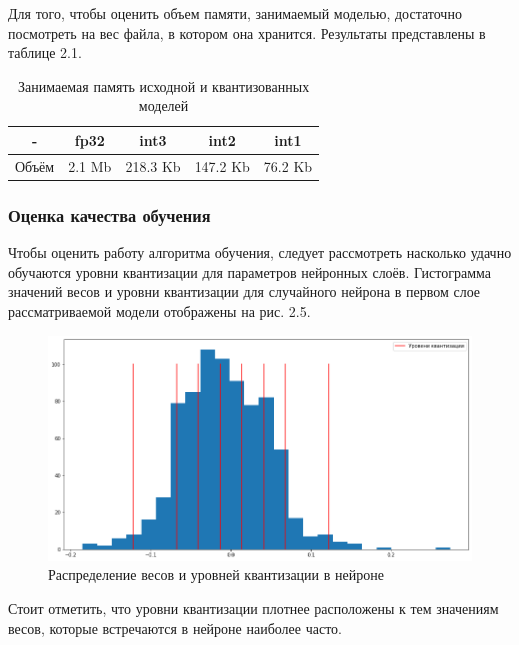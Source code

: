 Для того, чтобы оценить объем памяти, занимаемый моделью, достаточно посмотреть на вес файла, в котором она хранится. Результаты представлены в таблице 2.1.

\begin{table}[H]
\caption{Занимаемая память исходной и квантизованных моделей}
\begin{center}
\begin{tabular}{|c|c|c|c|c|}
\hline
 -  & fp32 & int3 & int2 & int1 \\
\hline
Объём & 2.1 Mb & 218.3 Kb & 147.2 Kb & 76.2 Kb \\
\hline
\end{tabular}
\end{center}
\end{table}

\subsubsection{Оценка качества обучения}

Чтобы оценить работу алгоритма обучения, следует рассмотреть насколько удачно обучаются уровни квантизации для параметров нейронных слоёв. Гистограмма значений весов и уровни квантизации для случайного нейрона в первом слое рассматриваемой модели отображены на рис. 2.5.

\begin{figure}[H]
    \begin{center}
        \includegraphics[scale=0.5]{tex/inc/img/firstneuro.png}
        \caption{Распределение весов и уровней квантизации в нейроне}
    \end{center}
\end{figure}


Стоит отметить, что уровни квантизации плотнее расположены к тем значениям весов, которые встречаются в нейроне наиболее часто.

